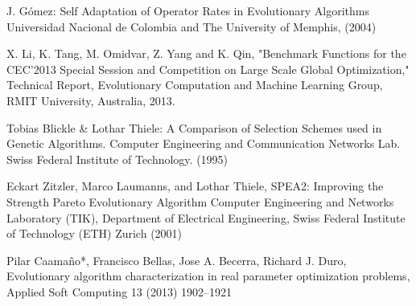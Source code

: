 \documentclass{llncs}
\begin{document}
\begin{thebibliography}{5}
%

J. Gómez:
Self Adaptation of Operator Rates in Evolutionary Algorithms
Universidad Nacional de Colombia and The University of Memphis, (2004)

X. Li, K. Tang, M. Omidvar, Z. Yang and K. Qin, "Benchmark Functions for the CEC'2013 Special Session and Competition on Large Scale Global Optimization," Technical Report, Evolutionary Computation and Machine Learning Group, RMIT University, Australia, 2013.

Tobias Blickle \& Lothar Thiele:
A Comparison of Selection Schemes used in Genetic Algorithms.
Computer Engineering and Communication Networks Lab.
Swiss Federal Institute of Technology. (1995)

Eckart Zitzler, Marco Laumanns, and Lothar Thiele,
SPEA2: Improving the Strength Pareto Evolutionary Algorithm
Computer Engineering and Networks Laboratory (TIK),
Department of Electrical Engineering,
Swiss Federal Institute of Technology (ETH) Zurich (2001)

Pilar Caamaño*, Francisco Bellas, Jose A. Becerra, Richard J. Duro, Evolutionary algorithm characterization in real parameter optimization problems, Applied Soft Computing 13 (2013) 1902–1921

\end{thebibliography}
\end{document}
